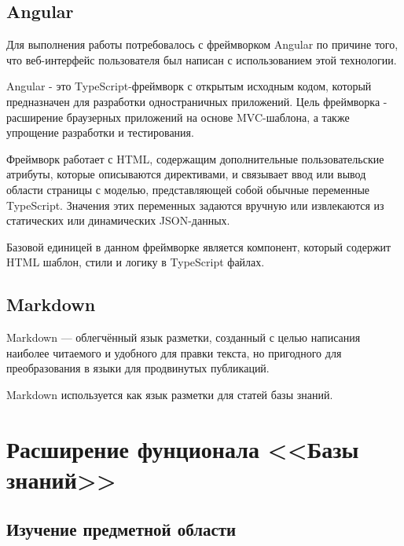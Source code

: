 \subsection{Angular}
Для выполнения работы потребовалось с фреймворком Angular по причине того, 
что веб-интерфейс пользователя был написан с использованием этой технологии.

Angular - это TypeScript-фреймворк с открытым исходным кодом, который 
предназначен для разработки одностраничных приложений. 
Цель фреймворка - расширение браузерных приложений на основе MVC-шаблона, 
а также упрощение разработки и тестирования.

Фреймворк работает с HTML, содержащим дополнительные пользовательские атрибуты, 
которые описываются директивами, и связывает ввод или вывод области страницы
с моделью, представляющей собой обычные переменные TypeScript. 
Значения этих переменных задаются 
вручную или извлекаются из статических или динамических JSON-данных.

Базовой единицей в данном фреймворке является компонент, который содержит
HTML шаблон, стили и логику в TypeScript файлах.

\vspace{2em}

\subsection{Markdown}

\vspace{1em}

Markdown — облегчённый язык разметки, созданный с целью написания
наиболее читаемого и удобного для правки текста, но пригодного для
преобразования в языки для продвинутых публикаций.

Markdown используется как язык разметки для статей базы знаний.

\vspace{2em}

\section{Расширение фунционала <<Базы знаний>>}

\vspace{1em}

\subsection{Изучение предметной области}


